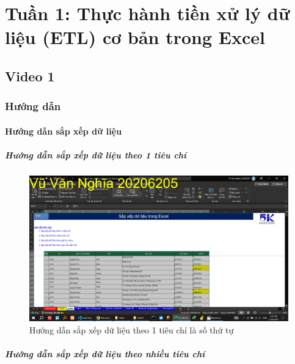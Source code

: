 \documentclass{article}
\begin{document}
\listoffigures
\newpage
\section{Tuần 1: Thực hành tiền xử lý dữ liệu (ETL) cơ bản trong Excel}
\subsection{Video 1}
\subsubsection{Hướng dẫn}
\paragraph{Hướng dẫn sắp xếp dữ liệu}
\subparagraph{Hướng dẫn sắp xếp dữ liệu theo 1 tiêu chí}

\begin{center}
    \begin{figure}[h]
        \centering
        \includegraphics[scale = 0.15]{Video1/HuongDan/1.png}
        \caption{Hướng dẫn sắp xếp dữ liệu theo 1 tiêu chí là số thứ tự}
    \end{figure}
\end{center}

\subparagraph{Hướng dẫn sắp xếp dữ liệu theo nhiều tiêu chí}
\end{document}
